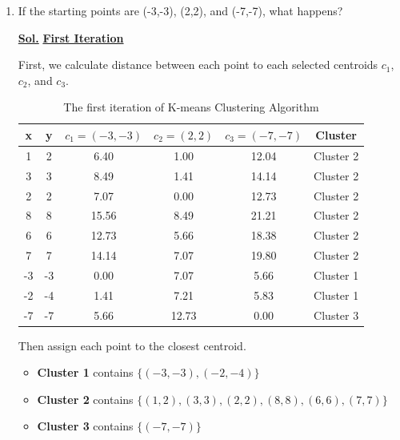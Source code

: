 \documentclass[12pt, a4paper]{article}
\newcommand{\sol}{\par\noindent\underline{\textbf{Sol.}} }
\begin{document}
\begin{enumerate}
        \item[\textbf{T6.}] If the starting points are (-3,-3), (2,2), and (-7,-7), what happens?

            \sol \underline{\textbf{First Iteration}}

            First, we calculate distance between each point to each selected centroids $c_{1}$, $c_{2}$, and $c_{3}$.
            \begin{table}[h]
                \centering
                \caption{The first iteration of K-means Clustering Algorithm}
                \begin{tabular}{|c|c|c|c|c|c|}
                    \hline
                    \rule{0pt}{2.5ex}
                    x & y & $c_{1} = (-3, -3)$ & $c_{2} = (2, 2)$ & $c_{3} = (-7, -7)$ & Cluster \\
                    \hline
                    1 & 2 & 6.40 & 1.00 & 12.04 & Cluster 2 \\
                    3 & 3 & 8.49 & 1.41 & 14.14 & Cluster 2 \\
                    2 & 2 & 7.07 & 0.00 & 12.73 & Cluster 2 \\
                    8 & 8 & 15.56 & 8.49 & 21.21 & Cluster 2 \\
                    6 & 6 & 12.73 & 5.66 & 18.38 & Cluster 2 \\
                    7 & 7 & 14.14 & 7.07 & 19.80 & Cluster 2 \\
                    -3 & -3 & 0.00 & 7.07 & 5.66 & Cluster 1 \\
                    -2 & -4 & 1.41 & 7.21 & 5.83 & Cluster 1 \\
                    -7 & -7 & 5.66 & 12.73 & 0.00 & Cluster 3 \\
                    \hline
                \end{tabular}
            \end{table}

            Then assign each point to the closest centroid.

            \begin{itemize}
                \item \textbf{Cluster 1} contains $\lbrace(-3, -3), (-2, -4)\rbrace$
                \item \textbf{Cluster 2} contains $\lbrace(1, 2), (3, 3), (2, 2), (8, 8), (6, 6), (7, 7)\rbrace$
                \item \textbf{Cluster 3} contains $\lbrace(-7, -7)\rbrace$
            \end{itemize}


\end{enumerate}
\end{document}
